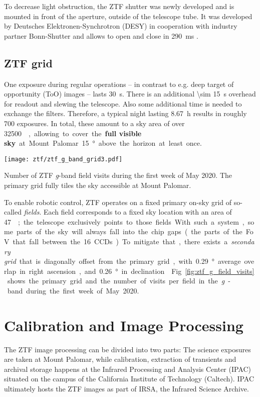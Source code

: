 To decrease light obstruction, the ZTF shutter was newly developed and is mounted in front of the aperture, outside of the telescope tube. It was developed by Deutsches Elektronen-Synchrotron (DESY) in cooperation with industry partner Bonn-Shutter and allows to open and close in \SI{290}{\milli \second} \cite{Dekany2020}.

\subsection{ZTF grid} \label{ztf_grid}
One exposure during regular operations -- in contrast to e.g. deep target of opportunity (ToO) images -- lasts \SI{30}{\second}. There is an additional \SI{\sim 15}{\second} overhead for readout and slewing the telescope. Also some additional time is needed to exchange the filters. Therefore, a typical night lasting \SI{8.67}{\hour}  results in roughly 700 exposures. In total, these amount to a sky area of over \SI{32500}{\square\deg}, allowing to cover the \textbf{full visible sky} at Mount Palomar \SI{15}{\degree} above the horizon at least once.

\begin{marginfigure}
    \texttt{[image: ztf/ztf\_g\_band\_grid3.pdf]}
    \caption[ZTF field visits]{Number of ZTF \textit{g}-band field visits during the first week of May 2020. The primary grid fully tiles the sky accessible at Mount Palomar.}
\end{marginfigure}

To enable robotic control, ZTF operates on a fixed primary on-sky grid of so-called \textit{fields}. Each field corresponds to a fixed sky location with an area of \SI{47}{\square\deg}; the telescope exclusively points to those fields. With such a system, some parts of the sky will always fall into the chip gaps (the parts of the FoV that fall between the 16 CCDs). To mitigate that, there exists a \textit{secondary grid} that is diagonally offset from the primary grid, with \SI{0.29}{\degree} average overlap in right ascension, and \SI{0.26}{\degree} in declination . Fig. \ref{fig:ztf_g_field_visits} shows the primary grid and the number of visits per field in the \textit{g}-band during the first week of May 2020.

\section{Calibration and Image Processing}
The ZTF image processing can be divided into two parts: The science exposures are taken at Mount Palomar, while calibration, extraction of transients and archival storage happens at the Infrared Processing and Analysis Center (IPAC) situated on the campus of the California Institute of Technology (Caltech). IPAC ultimately hosts the ZTF images as part of IRSA, the Infrared Science Archive.

